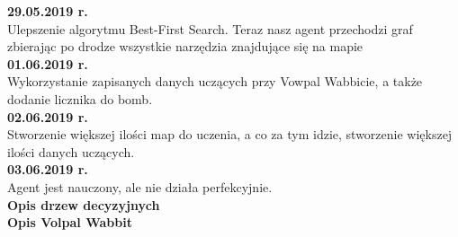 \documentclass[12pt]{article}
\newcounter{coun}[section]
\begin{document}
\noindent\textbf{29.05.2019 r.}
\setcounter{coun}{0}\\

Ulepszenie algorytmu Best-First Search. Teraz nasz agent przechodzi graf zbierając po drodze wszystkie narzędzia znajdujące się na mapie\\

\noindent\textbf{01.06.2019 r.}
\setcounter{coun}{0}\\

Wykorzystanie zapisanych danych uczących przy Vowpal Wabbicie, a także dodanie licznika do bomb.\\

\noindent\textbf{02.06.2019 r.}
\setcounter{coun}{0}\\

Stworzenie większej ilości map do uczenia, a co za tym idzie, stworzenie większej ilości danych uczących.\\

\noindent\textbf{03.06.2019 r.}
\setcounter{coun}{0}\\

Agent jest nauczony, ale nie działa perfekcyjnie.\\

\noindent \textbf{Opis drzew decyzyjnych}\\

\noindent \textbf{Opis Volpal Wabbit}\\
\end{document}
